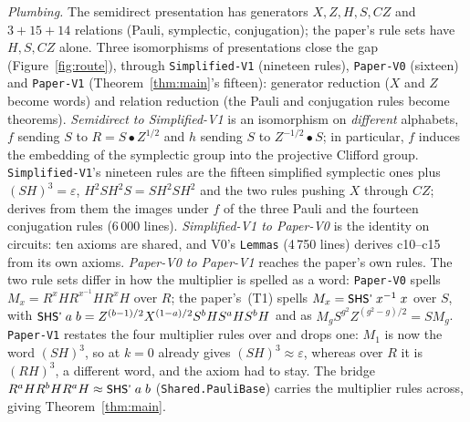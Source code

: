 \emph{Plumbing.}  The semidirect presentation has generators $X, Z, H,
S, CZ$ and $3 + 15 + 14$ relations (Pauli, symplectic, conjugation);
the paper's rule sets have $H, S, CZ$ alone.  Three isomorphisms of
presentations close the gap (Figure~\ref{fig:route}), through
\texttt{Simplified-V1} (nineteen rules), \texttt{Paper-V0} (sixteen)
and \texttt{Paper-V1} (Theorem~\ref{thm:main}'s
fifteen): generator reduction ($X$ and $Z$ become words) and relation
reduction (the Pauli and conjugation rules become theorems).
\emph{Semidirect to Simplified-V1} is an isomorphism on \emph{different}
alphabets, $f$ sending $S$ to $R = S \bullet Z^{1/2}$ and $h$ sending
$S$ to $Z^{-1/2} \bullet S$; in particular, $f$ induces the embedding
of the symplectic group into the projective Clifford
group.  \texttt{Simplified-V1}'s nineteen rules are the fifteen simplified symplectic ones
plus $(SH)^3 = \varepsilon$, $H^2SH^2S = SH^2SH^2$ and the two rules
pushing $X$ through $CZ$;  derives from them the
images under $f$ of the three Pauli and the fourteen conjugation
rules (6\,000 lines).  \emph{Simplified-V1 to Paper-V0} is
the identity on circuits: ten axioms are shared, and V0's \texttt{Lemmas}
(4\,750 lines) derives c10--c15 from its own axioms.
\emph{Paper-V0 to Paper-V1} reaches the paper's own rules.  The two
rule sets differ in how the multiplier is spelled as a word:
\texttt{Paper-V0} spells $M_x = R^{x}HR^{x^{-1}}HR^{x}H$ over $R$;
the paper's~(T1) spells $M_x = \mbox{\textsf{\small SHS'}}\;x^{-1}\;x$ over $S$, with
$\mbox{\textsf{\small SHS'}}\;a\;b = Z^{(b-1)/2}X^{(1-a)/2}S^{b}HS^{a}HS^{b}H$ and
 as $M_gS^{g^2}Z^{(g^2-g)/2} = SM_g$.  \texttt{Paper-V1}
restates the four multiplier rules over  and drops one:
$M_1$ is now the word $(SH)^3$, so  at $k = 0$ already
gives $(SH)^3 \approx \varepsilon$, whereas over $R$ it is $(RH)^3$,
a different word, and the axiom had to stay.  The bridge
$R^{a}HR^{b}HR^{a}H \approx \mbox{\textsf{\small SHS'}}\;a\;b$
(\texttt{Shared.PauliBase}) carries the multiplier rules across,
giving Theorem~\ref{thm:main}.

